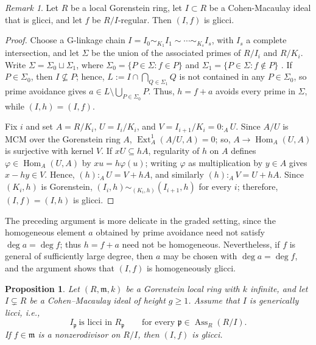 \documentclass[11pt,letterpaper]{amsart}
\DeclareMathOperator{\h}{Hom}
\DeclareMathOperator{\Ext}{Ext}
\DeclareMathOperator{\Ass}{Ass}
\theoremstyle{plain}
\newtheorem{prop}[thm]{Proposition}
\theoremstyle{definition}
\theoremstyle{remark}
\newtheorem{remark}[thm]{Remark}
\begin{document}
\begin{remark}
Let $R$ be a local Gorenstein ring, let $I\subset R$ be a Cohen-Macaulay ideal that is glicci, and let $f$ be $R/I$-regular. Then $(I,f)$ is glicci.
\end{remark}

\begin{proof}
Choose a G-linkage chain $I=I_0\sim_{K_1}I_1\sim\cdots\sim_{K_s}I_s$, with $I_s$ a complete intersection, and let $\Sigma$ be the union of the associated primes of $R/I_i$ and $R/K_i$. Write $\Sigma=\Sigma_0\sqcup\Sigma_1$, where $\Sigma_0=\{P\in\Sigma:f\in P\}$ and $\Sigma_1=\{P\in\Sigma:f\notin P\}$ . If $P\in\Sigma_0$, then $I\nsubseteq P$; hence, $L:=I\cap\bigcap_{Q\in\Sigma_1}Q$ is not contained in any $P\in\Sigma_0$, so prime avoidance gives $a\in L\setminus\bigcup_{P\in\Sigma_0}P$. Thus, $h=f+a$ avoids every prime in $\Sigma$, while $(I,h)=(I,f)$.

Fix $i$ and set $A=R/K_i$, $U=I_i/K_i$, and $V=I_{i+1}/K_i=0:_AU$. Since $A/U$ is MCM over the Gorenstein ring $A$, $\Ext_A^1(A/U,A)=0$; so, $A\to\h_A(U,A)$ is surjective with kernel $V$. If $xU\subseteq hA$, regularity of $h$ on $A$ defines $\varphi\in\h_A(U,A)$ by $xu=h\varphi(u)$; writing $\varphi$ as multiplication by $y\in A$ gives $x-hy\in V$. Hence, $(h):_AU=V+hA$, and similarly $(h):_AV=U+hA$. Since $(K_i,h)$ is Gorenstein, $(I_i,h)\sim_{(K_i,h)}(I_{i+1},h)$ for every $i$; therefore, $(I,f)=(I,h)$ is glicci.
\end{proof}
The preceding argument is more delicate in the graded setting, since the
homogeneous element \(a\) obtained by prime avoidance need not satisfy
\(\deg a=\deg f\); thus \(h=f+a\) need not be homogeneous. Nevertheless,
if \(f\) is general of sufficiently large degree, then \(a\) may be chosen
with \(\deg a=\deg f\), and the argument shows that \((I,f)\) is
homogeneously glicci.

\begin{prop}\label{genericallylicci}
Let $(R,\mathfrak m,k)$ be a Gorenstein local ring with $k$ infinite, and let
$I\subsetneq R$ be a Cohen--Macaulay ideal of height $g\geq1$. Assume that
$I$ is generically licci, i.e.,
\[
I_{\mathfrak p}\ \text{is licci in }R_{\mathfrak p}
\qquad\text{for every }\mathfrak p\in\Ass_R(R/I).
\]
If $f\in\mathfrak m$ is a nonzerodivisor on $R/I$, then $(I,f)$ is glicci.
\end{prop}
\end{document}
